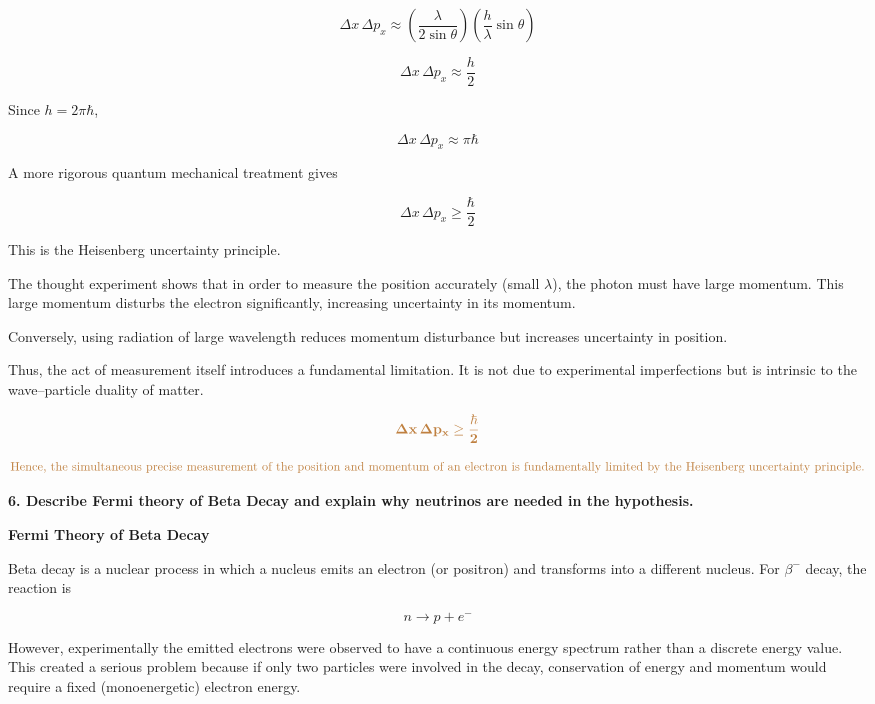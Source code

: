 \documentclass[a4paper, 12pt]{article}
\begin{document}
\[
\Delta x \, \Delta p_x
\approx
\left( \frac{\lambda}{2\sin\theta} \right)
\left( \frac{h}{\lambda} \sin\theta \right)
\]

\[
\Delta x \, \Delta p_x
\approx
\frac{h}{2}
\]

Since $h = 2\pi\hbar$,

\[
\Delta x \, \Delta p_x \approx \pi \hbar
\]

A more rigorous quantum mechanical treatment gives

\[
\Delta x \, \Delta p_x \geq \frac{\hbar}{2}
\]

This is the Heisenberg uncertainty principle.

\vspace{0.4cm}

The thought experiment shows that in order to measure the position accurately (small $\lambda$), the photon must have large momentum. 
This large momentum disturbs the electron significantly, increasing uncertainty in its momentum. 

Conversely, using radiation of large wavelength reduces momentum disturbance but increases uncertainty in position.

Thus, the act of measurement itself introduces a fundamental limitation. 
It is not due to experimental imperfections but is intrinsic to the wave–particle duality of matter.

\vspace{0.4cm}

\[
\textcolor{brown}{\mathbf{\Delta x \, \Delta p_x \geq \dfrac{\hbar}{2}}}
\]

\[
\textcolor{brown}{\mathbf{\text{Hence, the simultaneous precise measurement of the position and momentum of an electron is fundamentally limited by the Heisenberg uncertainty principle.}}}
\]

\textbf{6. Describe Fermi theory of Beta Decay and explain why neutrinos are needed in the hypothesis.}

\vspace{0.3cm}

\textbf{Fermi Theory of Beta Decay}

Beta decay is a nuclear process in which a nucleus emits an electron (or positron) and transforms into a different nucleus. 
For $\beta^{-}$ decay, the reaction is

\[
n \rightarrow p + e^{-}
\]

However, experimentally the emitted electrons were observed to have a continuous energy spectrum rather than a discrete energy value. 
This created a serious problem because if only two particles were involved in the decay, conservation of energy and momentum would require a fixed (monoenergetic) electron energy.
\end{document}
